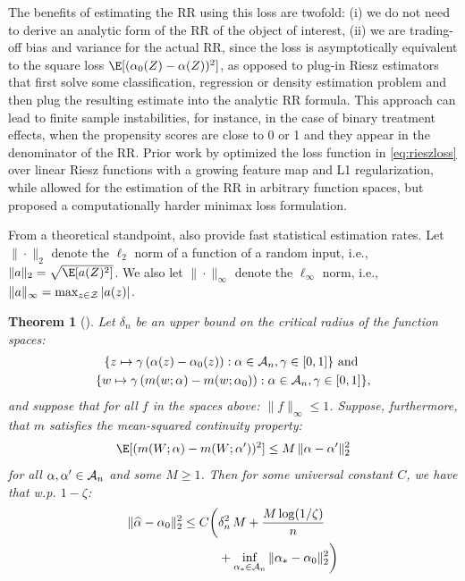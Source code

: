 \documentclass[nohyperref]{article}
\theoremstyle{plain}
\newtheorem{theorem}{Theorem}[section]
\theoremstyle{definition}
\theoremstyle{remark}
\begin{document}
The benefits of estimating the RR using this loss are twofold: (i) we do not need to derive an analytic form of the RR of the object of interest, (ii) we are trading-off bias and variance for the actual RR, since the loss is asymptotically equivalent to the square loss $\E[(\alpha_0(Z) - \alpha(Z))^2]$, as opposed to plug-in Riesz estimators that first solve some classification, regression or density estimation problem and then plug the resulting estimate into the analytic RR formula. This approach can lead to finite sample instabilities, for instance, in the case of binary treatment effects, when the propensity scores are close to 0 or 1 and they appear in the denominator of the RR. Prior work by \citet{chernozhukov2022automatic} optimized the loss function in \eqref{eq:rieszloss} over linear Riesz functions with a growing feature map and L1 regularization, while \citet{chernozhukov2020adversarial} allowed for the estimation of the RR in arbitrary function spaces, but proposed a computationally harder minimax loss formulation.

From a theoretical standpoint, \citet{chernozhukov2021automatic} also provide fast statistical estimation rates.
Let $\|\cdot\|_2$ denote the $\ell_2$ norm of a function of a random input, i.e., $\|a\|_2=\sqrt{\E[a(Z)^2]}$. We also let $\|\cdot\|_{\infty}$ denote the $\ell_{\infty}$ norm, i.e., $\|a\|_{\infty} = \max_{z\in {\cal Z}} |a(z)|$.

\vspace{0.5em}
\begin{theorem}[\citet{chernozhukov2021automatic}]\label{thm1}
Let $\delta_{n}$ be an upper bound on the critical radius \citep{wainwright2019high} of the function spaces:
\begin{gather*}
    \{z \mapsto \gamma\,(\alpha(z) - \alpha_0(z)): \alpha \in {\cal A}_n, \gamma \in [0,1]\} \notag \text{~and~} \\
    \{w \mapsto \gamma\,(m(w; \alpha)-m(w;\alpha_0)): \alpha \in {\cal A}_n, \gamma \in [0,1]\}, %
\end{gather*} and suppose that for all $f$ in the spaces above: $\|f\|_{\infty}\leq 1$. 
Suppose, furthermore, that $m$ satisfies the mean-squared continuity property:
\begin{align*} 
    \E[(m(W; \alpha) - m(W; \alpha'))^2] \leq M\, \|\alpha-\alpha'\|_2^2
\end{align*}
for all $\alpha,\alpha'\in {\cal A}_n$ and some $M\geq 1$. Then for some universal constant $C$, we have that w.p. $1-\zeta$:
\begin{align}
\begin{split}
    \|\widehat{\alpha}-\alpha_0\|_2^2 \leq C\bigg(& \delta_n^2\, M + \frac{M\log(1/\zeta)}{n} \\ & + \inf_{\alpha_*\in {\cal A}_n}\|\alpha_*-\alpha_0\|_2^2 \bigg)    
\end{split}
\end{align}
\end{theorem}
\end{document}
